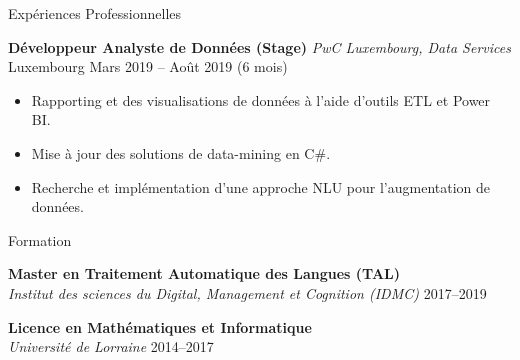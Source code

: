 \documentclass{resume} %
\begin{document}
\begin{rSection}{Expériences Professionnelles}
\vspace{0.2cm}

\textbf{Développeur Analyste de Données (Stage)} \hfill \textit{PwC Luxembourg, Data Services} \\
Luxembourg \hfill Mars 2019 -- Août 2019 (6 mois)
\begin{itemize}
    \item Rapporting et des visualisations de données à l’aide d’outils ETL et Power BI.
    \item Mise à jour des solutions de data-mining en C\#.
    \item Recherche et implémentation d'une approche NLU pour l’augmentation de données.
\end{itemize}

\end{rSection}

\begin{rSection}{Formation}

\textbf{Master en Traitement Automatique des Langues (TAL)} \\
\textit{Institut des sciences du Digital, Management et Cognition (IDMC)} \hfill 2017--2019

\textbf{Licence en Mathématiques et Informatique} \\
\textit{Université de Lorraine} \hfill 2014--2017 \\
\end{rSection}
\end{document}
